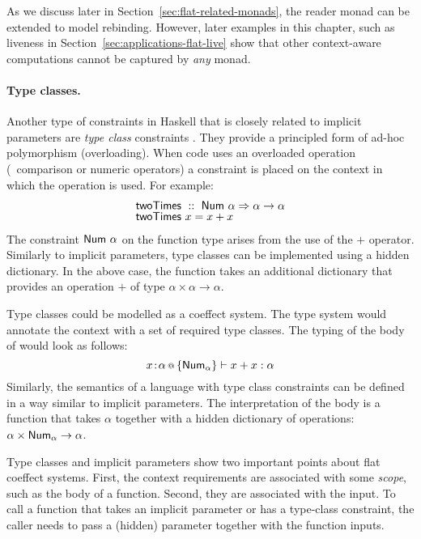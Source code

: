 As we discuss later in Section~\ref{sec:flat-related-monads}, the reader monad can be extended 
to model rebinding. However, later examples in this chapter, such as liveness in 
Section~\ref{sec:applications-flat-live} show that other context-aware computations 
cannot be captured by \emph{any} monad.


\paragraph{Type classes.}
Another type of constraints in Haskell that is closely related to implicit parameters are 
\emph{type class} constraints \cite{app-type-classes}. They provide a principled form of ad-hoc
polymorphism (overloading). When code uses an overloaded operation (\eg~comparison or numeric 
operators) a constraint is placed on the context in which the operation is used. For example:
%
\begin{equation*}
\begin{array}{l}
 \textnormal{\sffamily twoTimes}~::~\textnormal{\sffamily Num}~\alpha \Rightarrow \alpha \rightarrow \alpha \\[-0.25em]
 \textnormal{\sffamily twoTimes}~x=x+x
\end{array}
\end{equation*}
%
The constraint $\textnormal{\sffamily Num}~\alpha$ on the function type arises from the use of the $+$ operator. 
Similarly to implicit parameters, type classes can be implemented using a hidden dictionary. In 
the above case, the function  takes an additional dictionary that provides an operation
$+$ of type $\alpha \times \alpha \rightarrow \alpha$.

Type classes could be modelled as a coeffect system. The type system would annotate the context
with a set of required type classes. The typing of the body of  would look as 
follows:
%
\begin{equation*}
x\!:\!\alpha \,\text{\scriptsize @}\, {{\text{$ \{ \textnormal{\sffamily Num}_\alpha \} $}}} \vdash x + x : \alpha
\end{equation*}
%
Similarly, the semantics of a language with type class constraints can be defined in a way
similar to implicit parameters. The interpretation of the body is a function that takes $\alpha$
together with a hidden dictionary of operations: $\alpha \times \textnormal{\sffamily Num}_\alpha \rightarrow \alpha$.

Type classes and implicit parameters show two important points about flat coeffect systems.
First, the context requirements are associated with some \emph{scope}, such as the body
of a function. Second, they are associated with the input. To call a function that takes an 
implicit parameter or has a type-class constraint, the caller needs to pass a (hidden) parameter
together with the function inputs.

